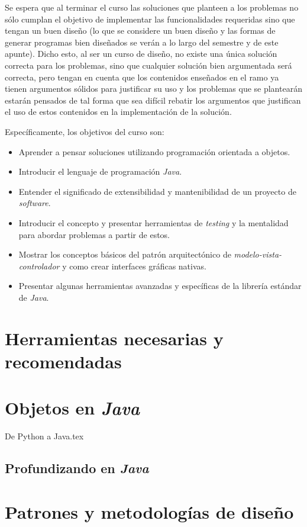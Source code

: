 \documentclass[12pt]{book}
\theoremstyle{definition}
\begin{document}
      Se espera que al terminar el curso las soluciones que planteen a los problemas no
      sólo cumplan el objetivo de implementar las funcionalidades requeridas sino que 
      tengan un buen diseño (lo que se considere un buen diseño y las formas de generar 
      programas bien diseñados se verán a lo largo del semestre y de este apunte).
      Dicho esto, al ser un curso de diseño, no existe una única solución correcta para 
      los problemas, sino que cualquier solución bien argumentada será correcta, pero 
      tengan en cuenta que los contenidos enseñados en el ramo ya tienen argumentos 
      sólidos para justificar su uso y los problemas que se plantearán estarán pensados de
      tal forma que sea difícil rebatir los argumentos que justifican el uso de estos 
      contenidos en la implementación de la solución.

      Específicamente, los objetivos del curso son:

      \begin{itemize}
        \item Aprender a pensar soluciones utilizando programación orientada a objetos.
        \item Introducir el lenguaje de programación \textit{Java}.
        \item Entender el significado de extensibilidad y mantenibilidad de un proyecto de 
          \textit{software}.
        \item Introducir el concepto y presentar herramientas de \textit{testing} y la 
          mentalidad para abordar problemas a partir de estos.
        \item Mostrar los conceptos básicos del patrón arquitectónico de 
          \textit{modelo-vista-controlador} y como crear interfaces gráficas nativas.
        \item Presentar algunas herramientas avanzadas y específicas de la librería 
            estándar de \textit{Java}.
      \end{itemize}

  \mainmatter
  \part{Herramientas necesarias y recomendadas}
    
    
  \part{Objetos en \textit{Java}}
    
    {De Python a Java.tex}
    \chapter{Profundizando en \textit{Java}}
      \label{ch:java}
  \part{Patrones y metodologías de diseño}
\end{document}
